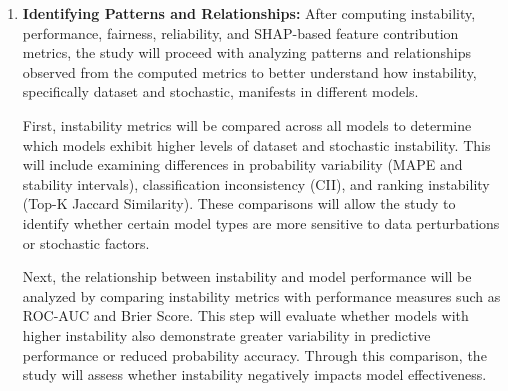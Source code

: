 \documentclass[12pt]{article}
\begin{document}
\begin{enumerate}
  SHAP values will be computed using model-specific explainers, where TreeExplainer will be applied to tree-based models such as Random Forest and XGBoost, and KernelExplainer will be used for Logistic Regression and LinearSVC. To ensure computational feasibility, a subset of the training data (e.g., 100 randomly sampled from the training data) will be used as the background dataset. The analysis will focus on both the magnitude and variability of SHAP values, where magnitude reflects the importance of a feature in influencing predictions, and variability across runs reflects the instability of that feature's contribution.

  To facilitate comparison, SHAP values will be aggregated across runs for each model, and summary statistics such as the mean and standard deviation will be computed for each feature. Visualizations, including SHAP summary plots and variability plots, will be used to illustrate the distribution and spread of SHAP values across runs. By integrating SHAP analysis with instability metrics, the study will identify features that consistently influence predictions as well as those whose contributions vary significantly, providing insight into how feature behavior contributes to model instability.

  \item \textbf{Identifying Patterns and Relationships:}
  After computing instability, performance, fairness, reliability, and SHAP-based feature contribution metrics, the study will proceed with analyzing patterns and relationships observed from the computed metrics to better understand how instability, specifically dataset and stochastic, manifests in different models.

  First, instability metrics will be compared across all models to determine which models exhibit higher levels of dataset and stochastic instability. This will include examining differences in probability variability (MAPE and stability intervals), classification inconsistency (CII), and ranking instability (Top-K Jaccard Similarity). These comparisons will allow the study to identify whether certain model types are more sensitive to data perturbations or stochastic factors.

  Next, the relationship between instability and model performance will be analyzed by comparing instability metrics with performance measures such as ROC-AUC and Brier Score. This step will evaluate whether models with higher instability also demonstrate greater variability in predictive performance or reduced probability accuracy. Through this comparison, the study will assess whether instability negatively impacts model effectiveness.


\end{enumerate}
\end{document}
